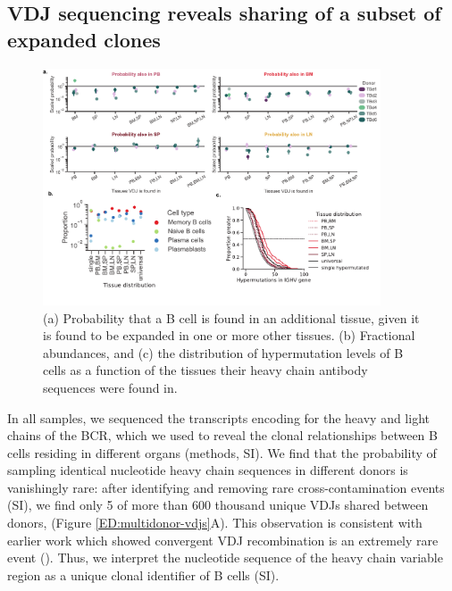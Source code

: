 \subsection{VDJ sequencing reveals sharing of a subset of expanded clones}
\begin{figure}
    \centering
    \includegraphics[width=10cm, keepaspectratio]{figs/Tabula_Bursa/Figure3_revised.pdf}
    \caption[Characteristics of clonally expanded B cells.]{ (a) Probability that a B cell is found in an additional tissue, given it is found to be expanded in one or more other tissues. (b) Fractional abundances, and (c) the distribution of hypermutation levels of B cells as a function of the tissues their heavy chain antibody sequences were found in.}
    \label{fig:clonally-expanded-B-cells}
\end{figure}
 In all samples, we sequenced the transcripts encoding for the heavy and light chains of the BCR, which we used to reveal the clonal relationships between B cells residing in different organs (methods, SI). We find that the probability of sampling identical nucleotide heavy chain sequences in different donors is vanishingly rare: after identifying and removing rare cross-contamination events (SI), we find only 5 of more than 600 thousand unique VDJs shared between donors, (Figure \ref{ED:multidonor-vdjs}A). This observation is consistent with earlier work which showed convergent VDJ recombination is an extremely rare event (\cite{mora2019many, briney2019commonality}). Thus, we interpret the nucleotide sequence of the heavy chain variable region as a unique clonal identifier of B cells (SI). 
 
